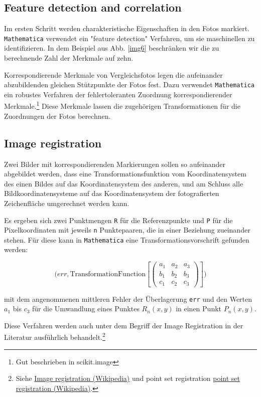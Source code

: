 \documentclass[twocolumn]{bmcart}
\begin{document}
\subsection{Feature detection and correlation}


Im ersten Schritt werden charakteristische Eigenschaften in den Fotos markiert. 
\texttt{Mathematica} verwendet ein "feature detection" Verfahren, um sie maschinellen zu identifizieren. In dem Beispiel aus Abb. \ref{img6} beschränken wir die zu berechnende Zahl der Merkmale auf zehn. 

Korrespondierende Merkmale von Vergleichsfotos legen die aufeinander abzubildenden gleichen Stützpunkte der Fotos fest. Dazu verwendet \texttt{Mathematica} ein robustes Verfahren der fehlertoleranten Zuordnung korrespondierender Merkmale.\footnote{Gut beschrieben in scikit.image} Diese Merkmale  lassen die zugehörigen Transformationen für die Zuordnungen der Fotos berechnen. 

\subsection{Image registration}

Zwei Bilder mit korrespondierenden Markierungen sollen so aufeinander abgebildet werden, dass eine Transformationsfunktion vom  Koordinatensystem des einen Bildes auf das Koordinatensystem des anderen, und am Schluss alle Bildkoordinatensysteme auf das Koordinatensystem der fotografierten Zeichenfläche umgerechnet werden kann. 

Es ergeben sich zwei Punktmengen \texttt{R} für die Referenzpunkte und \texttt{P} für die Pixelkoordinaten mit jeweils \texttt{n} Punktepaaren, die in einer Beziehung zueinander stehen. Für diese kann in  \texttt{Mathematica} eine Transformationsvorschrift gefunden werden:

\begin{equation}
({err, \mbox{TransformationFunction}[
\begin{pmatrix}
a_1 & a_2 & a_3  \\
b_1 & b_2 & b_3  \\
c_1 & c_2 & c_3 
\end{pmatrix}
  ])}
\end{equation} 

mit dem angenommenen mittleren Fehler der Überlagerung \texttt{err} und den Werten \texttt{$a_1$} bis \texttt{$c_3$} für die Umwandlung eines Punktes $R_n(x,y)$ in einen Punkt $P_n(x,y)$.

Diese Verfahren werden auch unter dem Begriff der Image Registration in der Literatur ausführlich behandelt.\footnote{Siehe \href{https://en.wikipedia.org/wiki/Imageregistration}{Image registration (Wikipedia)} und point set registration \href{https://en.wikipedia.org/wiki/Pointsetregistration}{point set registration (Wikipedia)}.}
\end{document}
